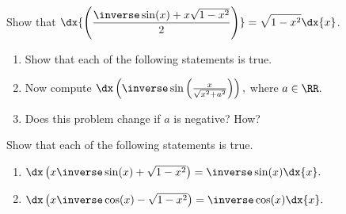 \begin{embeddedproblem}
  Show that
  $\displaystyle\dx{\left(\dfrac{\inverse\sin(x)+x\sqrt{1-x^2}}{2}\right)}=\sqrt{1-x^2}\dx{x}$.
\end{embeddedproblem}

\begin{embeddedproblem-enumerate}
  \begin{enumerate}[label={\bf{}(\alph*)}]
    \item   Show that each of the following statements is true.
  \begin{enumerate}[label={\bf{}(\roman*)}]
  \end{enumerate}
  \item Now compute
    $\dx\left(\inverse\sin\left(\frac{x}{\sqrt{x^2+a^2}}\right)\right),$
    where $a\in\RR.$
  \item  Does this problem change if $a$ is negative? How?
  \end{enumerate}
  \vskip-4mm{}
\end{embeddedproblem-enumerate}


\pagebreak[4]
\begin{embeddedproblem}
  Show that each of the following statements is true.
  \begin{enumerate}[label={\bf{}(\alph*)}]
    \item
      $\dx\left(x\inverse\sin(x)+\sqrt{1-x^2}\right) =
      \inverse\sin(x)\dx{x}.$
    \item
      $\dx\left(x\inverse\cos(x)-\sqrt{1-x^2}\right) =
      \inverse\cos(x)\dx{x}.$
    \end{enumerate}
    \vskip-6mm{}
\end{embeddedproblem}

